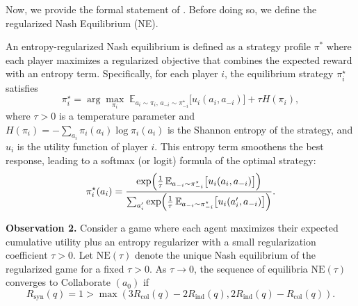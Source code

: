 Now, we provide the formal statement of . Before doing so, we define the regularized Nash Equilibrium (NE).
\begin{definition}[Regularized NE]
An entropy-regularized Nash equilibrium is defined as a strategy profile $\pi^\ast$ where each player maximizes a regularized objective that combines the expected reward with an entropy term. Specifically, for each player \(i\), the equilibrium strategy \(\pi_i^\star\) satisfies 
\[
\pi_i^\star = \arg\max_{\pi_i} \; \mathbb{E}_{a_i \sim \pi_i,\, a_{-i} \sim \pi_{-i}^\star}\bigl[u_i(a_i,a_{-i})\bigr] + \tau H(\pi_i),
\]
where \(\tau>0\) is a temperature parameter and \(H(\pi_i) = -\sum_{a_i} \pi_i(a_i) \log \pi_i(a_i)\) is the Shannon entropy of the strategy, and $u_i$ is the utility function of player $i$. This entropy term smoothens the best response, leading to a softmax (or logit) formula of the optimal strategy:
\[
\pi_i^\star(a_i) = \frac{\exp\Bigl(\frac{1}{\tau}\, \mathbb{E}_{a_{-i} \sim \pi_{-i}^\star}\bigl[u_i(a_i,a_{-i})\bigr]\Bigr)}{\sum_{a_i'} \exp\Bigl(\frac{1}{\tau}\, \mathbb{E}_{a_{-i} \sim \pi_{-i}^\star}\bigl[u_i(a_i',a_{-i})\bigr]\Bigr)}.
\]
\end{definition}









\noindent \textbf{Observation 2. }
Consider a game where each agent maximizes their expected cumulative utility plus an entropy regularizer with a small regularization coefficient \(\tau > 0\). Let \(\text{NE}(\tau)\) denote the unique Nash equilibrium of the regularized game for a fixed \(\tau > 0\). As \(\tau \to 0\), the sequence of equilibria \(\text{NE}(\tau)\) converges to  Collaborate $(a_0)$ if   
$$R_{\text{syn}}(q) = 1 > \max( 3R_{\text{col}}(q) - 2R_{\text{ind}}(q),2R_{\text{ind}}(q) - R_{\text{col}}(q)).$$




